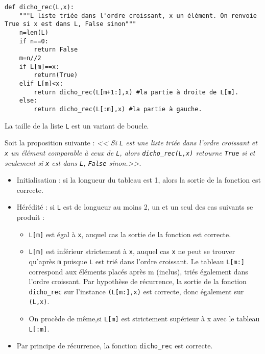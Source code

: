 \begin{lstlisting}
def dicho_rec(L,x):
    """L liste triée dans l'ordre croissant, x un élément. On renvoie True si x est dans L, False sinon"""
    n=len(L)
    if n==0:
        return False
    m=n//2
    if L[m]==x:
        return(True)
    elif L[m]<x:
        return dicho_rec(L[m+1:],x) #la partie à droite de L[m].
    else:
        return dicho_rec(L[:m],x) #la partie à gauche.
\end{lstlisting}

\ifprof
\begin{corrige}
La taille de la liste \texttt{L} est un variant de boucle.
\end{corrige}
\else
\fi

Soit la proposition suivante : 
\textit{<< Si \texttt{L} est une liste triée dans l’ordre croissant et \texttt{x} un élément comparable à ceux de \texttt{L}, alors \texttt{dicho\_rec(L,x)} retourne \texttt{True} si et seulement si \texttt{x} est dans \texttt{L}, \texttt{False} sinon.>>}.

\ifprof
\begin{corrige}
\begin{itemize}
\item Initialisation : si la longueur du tableau est 1, alors la sortie de la fonction est correcte.
\item Hérédité : si \texttt{L} est de longueur au moins 2, un et un seul des cas suivants se produit :
\begin{itemize}
\item \texttt{L[m]} est égal à \texttt{x}, auquel cas la sortie de la fonction est correcte.
\item \texttt{L[m]} est inférieur strictement à \texttt{x}, auquel cas \texttt{x} ne peut se trouver qu’après \texttt{m} puisque \texttt{L} est trié dans l’ordre
croissant. Le tableau \texttt{L[m:]} correspond aux éléments placés après m (inclus), triés également dans l’ordre
croissant. Par hypothèse de récurrence, la sortie de la fonction \texttt{dicho\_rec} sur l’instance \texttt{(L[m:],x)} est
correcte, donc également sur \texttt{(L,x)}.
\item On procède de même,si \texttt{L[m]} est strictement supérieur à x avec le tableau \texttt{L[:m]}.
\end{itemize}
\item Par principe de récurrence, la fonction \texttt{dicho\_rec} est correcte.
\end{itemize}
\end{corrige}
\else
\fi
